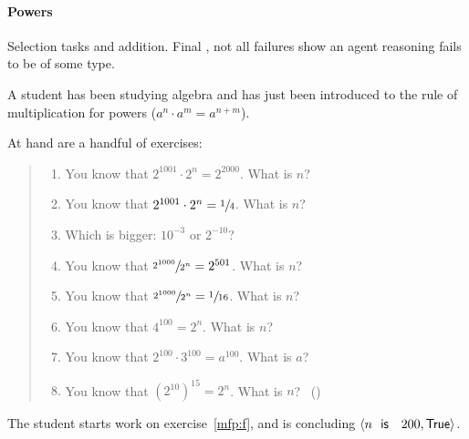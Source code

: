 \paragraph*{Powers}

\begin{note}
  Selection tasks and addition.
  Final , not all failures show an agent reasoning fails to be of some type.
\end{note}

\begin{note}
  \begin{scenario}
    \label{illu:tR:powers}
    A student has been studying algebra and has just been introduced to the rule of multiplication for powers (\(a^{n} \cdot a^{m} = a^{n + m}\)).

    At hand are a handful of exercises:

    \begin{quote}
      \begin{enumerate}[label=(\alph*), ref=(\alph*)]
      \item
        \label{mfp:a}
        You know that \(2^{1001} \cdot 2^{n} = 2^{2000}\).
        What is \(n\)?
      \item
        \label{mfp:b}
        You know that \(2^{1001} \cdot 2^{n} = \sfrac{1}{4}\).
        What is \(n\)?
      \item
        \label{mfp:c}
        Which is bigger: \(10^{-3}\) or \(2^{-10}\)?
      \item
        \label{mfp:d}
        You know that \(\sfrac{2^{1000}}{2^{n}} = 2^{501}\).
        What is \(n\)?
      \item
        \label{mfp:e}
        You know that \(\sfrac{2^{1000}}{2^{n}} = \sfrac{1}{16}\).
        What is \(n\)?
      \item
        \label{mfp:f}
        You know that \(4^{100} = 2^{n}\).
        What is \(n\)?
      \item
        \label{mfp:g}
        You know that \(2^{100} \cdot 3^{100} = a^{100}\).
        What is \(a\)?
      \item
        \label{mfp:h}
        You know that \((2^{10})^{15} = 2^{n}\).
        What is \(n\)?%
        \mbox{ }\hfill\mbox{(\cite[32]{Gelfand:1993aa})}
      \end{enumerate}
    \end{quote}

    The student starts work on exercise~\ref{mfp:f}, and is concluding \(\pv{n\propI{ is }200}{\valI{True}}\).
  \end{scenario}


\end{note}
